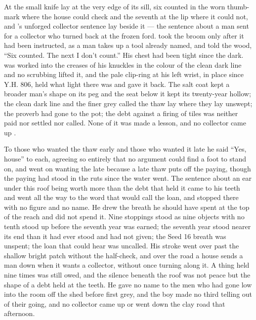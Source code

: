 \scenebreak

At  the small knife lay at the very edge of its sill, six counted in the worn thumb-mark where the house could check and the seventh at the lip where it could not, and 's unforged collector sentence lay beside it --- the sentence about a man sent for a collector who turned back at the frozen ford.  took the broom only after it had been instructed, as a man takes up a tool already named, and told the wood, “Six counted. The next I don't count.” His chest had been tight since the dark.  was worked into the creases of his knuckles in the colour of the clean dark line and no scrubbing lifted it, and the pale clip-ring at his left wrist, in place since Y.H. 806, held what light there was and gave it back. The salt coat kept a broader man's shape on its peg and the seat below it kept its twenty-year hollow; the clean dark line and the finer grey called the thaw lay where they lay unswept; the proverb had gone to the pot; the debt against a firing of tiles was neither paid nor settled nor called. None of it was made a lesson, and no collector came up .

To those who wanted the thaw early and those who wanted it late he said “Yes, house” to each, agreeing so entirely that no argument could find a foot to stand on, and went on wanting the late because a late thaw puts off the paying, though the paying had stood in the ruts since the water went. The sentence about an ear under this roof being worth more than the debt that held it came to his teeth and went all the way to the word that would call the loan, and stopped there with no figure and no name. He drew the breath he should have spent at the top of the reach and did not spend it. Nine stoppings stood as nine objects with no tenth stood up before the seventh year was earned; the seventh year stood nearer its end than it had ever stood and had not given; the Seed 16 breath was unspent; the loan that could hear was uncalled. His stroke went over  past the shallow bright patch without the half-check, and over the road a house sends a man down when it wants a collector, without once turning along it. A thing held nine times was still owed, and the silence beneath the roof was not peace but the shape of a debt held at the teeth. He gave no name to the men who had gone low into the room off the shed before first grey, and the boy made no third telling out of their going, and no collector came up or went down the clay road that afternoon.

